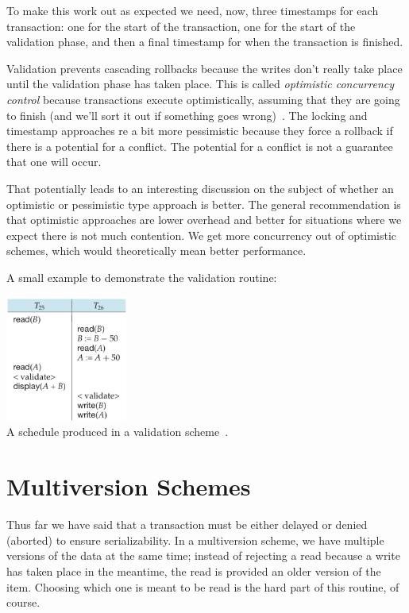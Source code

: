 To make this work out as expected we need, now, three timestamps for each transaction: one for the start of the transaction, one for the start of the validation phase, and then a final timestamp for when the transaction is finished.

Validation prevents cascading rollbacks because the writes don't really take place until the validation phase has taken place. This is called \textit{optimistic concurrency control} because transactions execute optimistically, assuming that they are going to finish (and we'll sort it out if something goes wrong)~\cite{dsc}. The locking and timestamp approaches re a bit more pessimistic because they force a rollback if there is a potential for a conflict. The potential for a conflict is not a guarantee that one will occur.

That potentially leads to an interesting discussion on the subject of whether an optimistic or pessimistic type approach is better. The general recommendation is that optimistic approaches are lower overhead and better for situations where we expect there is not much contention. We get more concurrency out of optimistic schemes, which would theoretically mean better performance.

A small example to demonstrate the validation routine:

\begin{center}
	\includegraphics[width=0.3\textwidth]{images/validation}\\
	A schedule produced in a validation scheme~\cite{dsc}.
\end{center}

\section*{Multiversion Schemes}

Thus far we have said that a transaction must be either delayed or denied (aborted) to ensure serializability. In a multiversion scheme, we have multiple versions of the data at the same time; instead of rejecting a read because a write has taken place in the meantime, the read is provided an older version of the item. Choosing which one is meant to be read is the hard part of this routine, of course.

